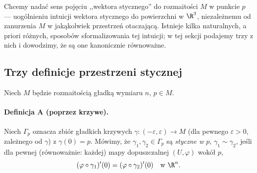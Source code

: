 Chcemy nadać sens pojęciu ,,wektora stycznego'' do rozmaitości $M$ w punkcie $p$ —
uogólnieniu intuicji wektora stycznego do powierzchni w $\R^3$, niezależnemu od
zanurzenia $M$ w jakąkolwiek przestrzeń otaczającą. Istnieje kilka naturalnych, a priori
różnych, sposobów sformalizowania tej intuicji; w tej sekcji podajemy trzy z nich i
dowodzimy, że są one kanonicznie równoważne.

\subsection*{Trzy definicje przestrzeni stycznej}

Niech $M$ będzie rozmaitością gładką wymiaru $n$, $p\in M$.

\paragraph*{Definicja A (poprzez krzywe).} Niech $\Gamma_p$ oznacza zbiór gładkich krzywych
$\gamma\colon(-\varepsilon,\varepsilon)\to M$ (dla pewnego $\varepsilon>0$, zależnego od
$\gamma$) z $\gamma(0)=p$. Mówimy, że $\gamma_1,\gamma_2\in\Gamma_p$ są \emph{styczne w
$p$}, $\gamma_1\sim\gamma_2$, jeśli dla pewnej (równoważnie: każdej) mapy dopuszczalnej
$(U,\varphi)$ wokół $p$,
\[
(\varphi\circ\gamma_1)'(0)=(\varphi\circ\gamma_2)'(0)\quad\text{w }\R^n.
\]

